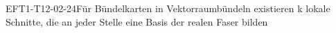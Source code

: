 
\begin{REM}{EFT1-T12-02-24}{Für Bündelkarten in Vektorraumbündeln existieren k lokale Schnitte, die an jeder Stelle eine Basis der realen Faser bilden}
\end{REM}

